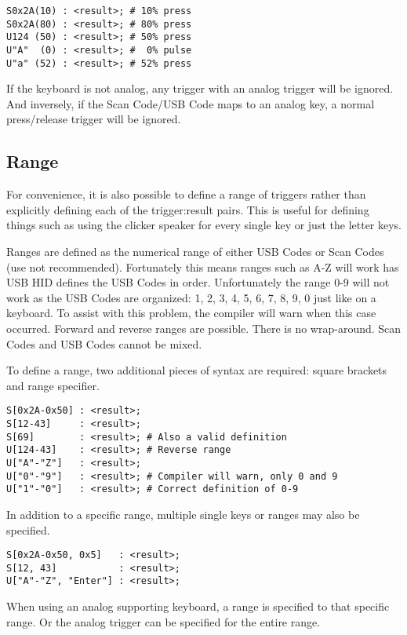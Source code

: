 \documentclass{kiibohd-template}
\begin{document}
\begin{lstlisting}
S0x2A(10) : <result>; # 10% press
S0x2A(80) : <result>; # 80% press
U124 (50) : <result>; # 50% press
U"A"  (0) : <result>; #  0% pulse
U"a" (52) : <result>; # 52% press
\end{lstlisting}

If the keyboard is not analog, any trigger with an analog trigger will be ignored.
And inversely, if the Scan Code/USB Code maps to an analog key, a normal press/release trigger will be ignored.


\subsection{Range}

For convenience, it is also possible to define a range of triggers rather than explicitly defining each of the trigger:result pairs.
This is useful for defining things such as using the clicker speaker for every single key or just the letter keys.

Ranges are defined as the numerical range of either USB Codes or Scan Codes (use not recommended).
Fortunately this means ranges such as A-Z will work has USB HID defines the USB Codes in order.
Unfortunately the range 0-9 will not work as the USB Codes are organized: 1, 2, 3, 4, 5, 6, 7, 8, 9, 0 just like on a keyboard.
To assist with this problem, the compiler will warn when this case occurred.
Forward and reverse ranges are possible.
There is no wrap-around.
Scan Codes and USB Codes cannot be mixed.

To define a range, two additional pieces of syntax are required: square brackets and range specifier.

\begin{lstlisting}
S[0x2A-0x50] : <result>;
S[12-43]     : <result>;
S[69]        : <result>; # Also a valid definition
U[124-43]    : <result>; # Reverse range
U["A"-"Z"]   : <result>;
U["0"-"9"]   : <result>; # Compiler will warn, only 0 and 9
U["1"-"0"]   : <result>; # Correct definition of 0-9
\end{lstlisting}

In addition to a specific range, multiple single keys or ranges may also be specified.

\begin{lstlisting}
S[0x2A-0x50, 0x5]   : <result>;
S[12, 43]           : <result>;
U["A"-"Z", "Enter"] : <result>;
\end{lstlisting}

When using an analog supporting keyboard, a range is specified to that specific range.
Or the analog trigger can be specified for the entire range.
\end{document}
